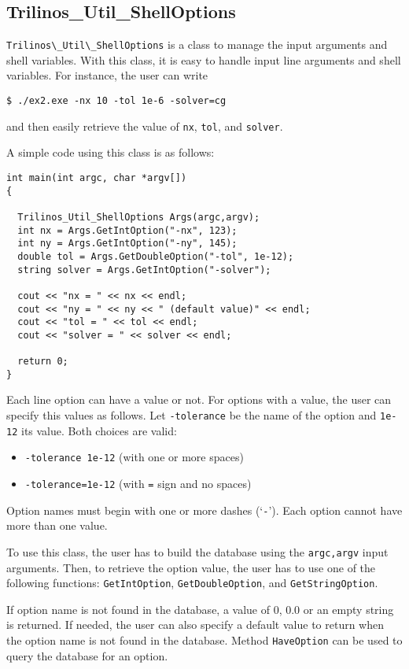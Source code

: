 
\subsection{Trilinos\_Util\_ShellOptions}
\label{sec:triutils:shell}

\verb!Trilinos\_Util\_ShellOptions! is a class to manage the input
arguments and shell variables.  With this class, it is easy to handle
input line arguments and shell variables. For instance, the user can
write
\begin{verbatim}
$ ./ex2.exe -nx 10 -tol 1e-6 -solver=cg 
\end{verbatim}
and then easily retrieve the value of {\tt nx}, {\tt tol}, and {\tt solver}.
 
A simple code using this class is as follows:
\begin{verbatim}
int main(int argc, char *argv[])
{

  Trilinos_Util_ShellOptions Args(argc,argv);
  int nx = Args.GetIntOption("-nx", 123);
  int ny = Args.GetIntOption("-ny", 145);
  double tol = Args.GetDoubleOption("-tol", 1e-12);
  string solver = Args.GetIntOption("-solver");

  cout << "nx = " << nx << endl;
  cout << "ny = " << ny << " (default value)" << endl;
  cout << "tol = " << tol << endl;
  cout << "solver = " << solver << endl;

  return 0;
}
\end{verbatim}

Each line   option can have a value or not. For options with a value,
the user can specify this values as follows. Let \verb!-tolerance! be the
name of the option and \verb!1e-12! its value. Both choices are valid:
\begin{itemize}
\item \verb!-tolerance 1e-12! (with one or more spaces)
\item \verb!-tolerance=1e-12! (with \verb!=! sign and no spaces)
\end{itemize}

Option names must begin with one or more dashes (`\verb!-!'). Each option
cannot have more than one value.

To use this class, the user has to build the database using the 
\verb!argc,argv! input arguments. Then, to retrieve the option value, the user
 has to use one of the following functions:
\verb!GetIntOption!, \verb!GetDoubleOption!, and \verb!GetStringOption!.
 
If option name is not found in the database, a value of 0, 0.0 or an
 empty string is returned. If needed, the user can also specify a
 default value to return when the option name is not found in the
 database. Method \verb!HaveOption! can be used to query the database for
 an option.

